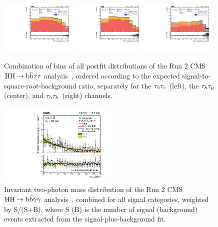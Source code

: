 \begin{figure}[htb!]
    \centering
    \includegraphics[trim=270pt 120pt 30pt 20pt, clip, width=0.32\textwidth]{figures/05-HH/CMS-results/bbtautau/Figure_005-a.png}
    \includegraphics[trim=270pt 120pt 30pt 20pt, clip, width=0.32\textwidth]{figures/05-HH/CMS-results/bbtautau/Figure_005-b.png}
    \includegraphics[trim=270pt 120pt 30pt 20pt, clip, width=0.32\textwidth]{figures/05-HH/CMS-results/bbtautau/Figure_005-c.png}
    \caption{Combination of bins of all postfit distributions of the Run 2 CMS ${\textrm{H}\textrm{H}}\to\textrm{b}\bar{\textrm{b}}\tau\tau$ analysis~\cite{CMS:2022hgz}, ordered according to the expected signal-to-square-root-background ratio, separately for the $\tau_h\tau_e$ (left), the $\tau_h\tau_\mu$ (center), and $\tau_h\tau_h$ (right) channels.}
    \label{fig:05_bbtautau}
\end{figure}

\begin{figure}[htb!]
    \centering
    \includegraphics[trim=250pt 25pt 0 20pt, clip, width=0.5\textwidth]{figures/05-HH/CMS-results/bbgg.png}
    \caption[Invariant two-photon mass distribution of the Run 2 CMS $\HH\to\bbgg$ analysis~\cite{CMS:2020tkr}.]{Invariant two-photon mass distribution of the Run 2 CMS $\HH\to\bbgg$ analysis~\cite{CMS:2020tkr}, combined for all signal categories, weighted by S/(S+B), where S (B) is the number of signal (background) events extracted from the signal-plus-background fit.}
    \label{fig:05_bbgg}
\end{figure}

